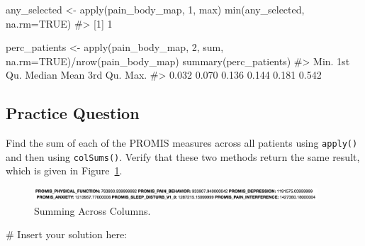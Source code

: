 \documentclass[
  letterpaper,
]{krantz}
\makeatletter
\newenvironment{Shaded}{\begin{snugshade}}{\end{snugshade}}
\newcommand{\AttributeTok}[1]{\textcolor[rgb]{0.40,0.45,0.13}{#1}}
\newcommand{\CommentTok}[1]{\textcolor[rgb]{0.37,0.37,0.37}{#1}}
\newcommand{\ConstantTok}[1]{\textcolor[rgb]{0.56,0.35,0.01}{#1}}
\newcommand{\DecValTok}[1]{\textcolor[rgb]{0.68,0.00,0.00}{#1}}
\newcommand{\FunctionTok}[1]{\textcolor[rgb]{0.28,0.35,0.67}{#1}}
\newcommand{\NormalTok}[1]{\textcolor[rgb]{0.00,0.23,0.31}{#1}}
\newcommand{\OtherTok}[1]{\textcolor[rgb]{0.00,0.23,0.31}{#1}}
\newcommand{\SpecialCharTok}[1]{\textcolor[rgb]{0.37,0.37,0.37}{#1}}
\newenvironment{kframe}{%
\medskip{}
\setlength{\fboxsep}{.8em}
 \def\at@end@of@kframe{}%
 \ifinner\ifhmode%
  \def\at@end@of@kframe{\end{minipage}}%
  \begin{minipage}{\columnwidth}%
 \fi\fi%
 \def\FrameCommand##1{\hskip\@totalleftmargin \hskip-\fboxsep
 \colorbox{shadecolor}{##1}\hskip-\fboxsep
     \hskip-\linewidth \hskip-\@totalleftmargin \hskip\columnwidth}%
 \MakeFramed {\advance\hsize-\width
   \@totalleftmargin\z@ \linewidth\hsize
   \@setminipage}}%
 {\par\unskip\endMakeFramed%
 \at@end@of@kframe}
\renewenvironment{Shaded}{\begin{kframe}}{\end{kframe}}
\makeatother
\begin{document}
\begin{Shaded}
\begin{Highlighting}[]
\NormalTok{any\_selected }\OtherTok{\textless{}{-}} \FunctionTok{apply}\NormalTok{(pain\_body\_map, }\DecValTok{1}\NormalTok{, max)}
\FunctionTok{min}\NormalTok{(any\_selected, }\AttributeTok{na.rm=}\ConstantTok{TRUE}\NormalTok{)}
\CommentTok{\#\textgreater{} [1] 1}
\end{Highlighting}
\end{Shaded}

\begin{Shaded}
\begin{Highlighting}[]
\NormalTok{perc\_patients }\OtherTok{\textless{}{-}} \FunctionTok{apply}\NormalTok{(pain\_body\_map, }\DecValTok{2}\NormalTok{, sum, }\AttributeTok{na.rm=}\ConstantTok{TRUE}\NormalTok{)}\SpecialCharTok{/}\FunctionTok{nrow}\NormalTok{(pain\_body\_map)}
\FunctionTok{summary}\NormalTok{(perc\_patients)}
\CommentTok{\#\textgreater{}    Min. 1st Qu.  Median    Mean 3rd Qu.    Max. }
\CommentTok{\#\textgreater{}   0.032   0.070   0.136   0.144   0.181   0.542}
\end{Highlighting}
\end{Shaded}

\hypertarget{practice-question-4}{%
\subsection{Practice Question}\label{practice-question-4}}

Find the sum of each of the PROMIS measures across all patients using
\texttt{apply()} and then using \texttt{colSums()}. Verify that these
two methods return the same result, which is given in
Figure~\ref{fig-pq2}.

\begin{figure}

{\centering \includegraphics[width=4.16667in,height=\textheight]{book/images/3-practicequestion2answer.png}

}

\caption{\label{fig-pq2}Summing Across Columns.}

\end{figure}

\begin{Shaded}
\begin{Highlighting}[]
\CommentTok{\# Insert your solution here:}
\end{Highlighting}
\end{Shaded}
\end{document}
